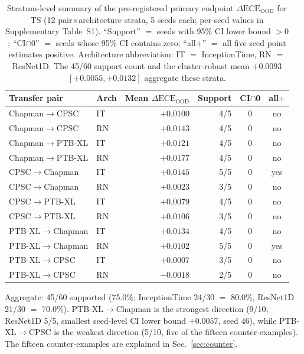 \documentclass[final,5p,times,nonatbib]{elsarticle}
\begin{document}
\begin{table}[tb]
\centering
\caption{Stratum-level summary of the pre-registered primary endpoint
$\Delta\text{ECE}_{\text{OOD}}$ for TS (12 pair$\times$architecture
strata, 5 seeds each; per-seed values in Supplementary Table~S1).
``Support'' $=$ seeds with 95\% CI lower bound $>0$; ``CI$\cap$0'' $=$
seeds whose 95\% CI contains zero; ``all$+$'' $=$ all five seed point
estimates positive. Architecture abbreviation: IT $=$ InceptionTime,
RN $=$ ResNet1D. The 45/60 support count and the cluster-robust mean
$+0.0093$ $[+0.0055,+0.0132]$ aggregate these strata.}
\label{tab:stratum_summary}
\begin{tabular}{llrrcc}
\toprule
Transfer pair & Arch & Mean $\Delta\text{ECE}_{\text{OOD}}$ & Support & CI$\cap$0 & all$+$ \\
\midrule
Chapman$\rightarrow$CPSC & IT & $+0.0100$ & 4/5 & 0 & no \\
Chapman$\rightarrow$CPSC & RN & $+0.0143$ & 4/5 & 0 & no \\
Chapman$\rightarrow$PTB-XL & IT & $+0.0121$ & 4/5 & 0 & no \\
Chapman$\rightarrow$PTB-XL & RN & $+0.0177$ & 4/5 & 0 & no \\
CPSC$\rightarrow$Chapman & IT & $+0.0145$ & 5/5 & 0 & yes \\
CPSC$\rightarrow$Chapman & RN & $+0.0023$ & 3/5 & 0 & no \\
CPSC$\rightarrow$PTB-XL & IT & $+0.0079$ & 4/5 & 0 & no \\
CPSC$\rightarrow$PTB-XL & RN & $+0.0106$ & 3/5 & 0 & no \\
PTB-XL$\rightarrow$Chapman & IT & $+0.0134$ & 4/5 & 0 & no \\
PTB-XL$\rightarrow$Chapman & RN & $+0.0102$ & 5/5 & 0 & yes \\
PTB-XL$\rightarrow$CPSC & IT & $+0.0007$ & 3/5 & 0 & no \\
PTB-XL$\rightarrow$CPSC & RN & $-0.0018$ & 2/5 & 0 & no \\
\bottomrule
\end{tabular}
\end{table}


Aggregate: 45/60 supported (75.0\%; InceptionTime 24/30 $=$
80.0\%, ResNet1D 21/30 $=$ 70.0\%). PTB-XL$\rightarrow$Chapman is the
strongest direction (9/10; ResNet1D 5/5, smallest seed-level CI lower
bound $+0.0057$, seed 46), while PTB-XL$\rightarrow$CPSC is the weakest
direction (5/10, five of the fifteen counter-examples). The fifteen
counter-examples are explained in Sec.~\ref{sec:counter}.
\end{document}
